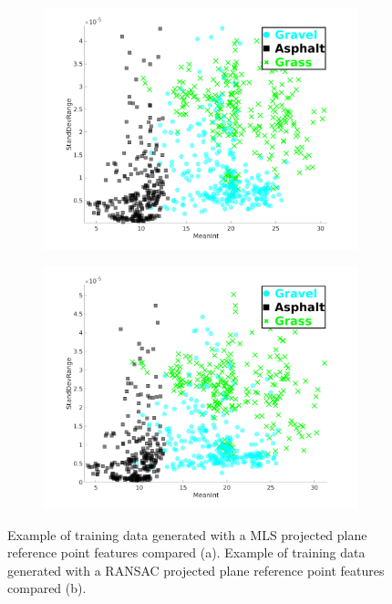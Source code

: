 \documentclass[numbered,pdftex]{ohio-etd}
\begin{document}
{{		\begin{figure}[H]
			\centering
			\begin{subfigure}{0.475\textwidth}
			\centering
			\includegraphics[width=1.0\linewidth]{Defense_Images/MLS_MeanInt_StandDevRange}
			\caption[]{}
			\label{fig:mls_training_data_cluster}
			\end{subfigure}
			\begin{subfigure}{0.475\textwidth}
			\centering
			\includegraphics[width=1.0\linewidth]{Defense_Images/Ransac_MeanInt_StandDevRange}
			\caption[]{}
			\label{fig:ransac_training_data_cluster}
			\end{subfigure}
			\caption[MLS \& RANSAC Data Clustering]{Example of training data generated with a MLS projected plane reference point features compared (a). Example of training data generated with a RANSAC projected plane reference point features compared (b).}
			\label{fig:ransac_mls_training_data_clusters}
		\end{figure}
	
}}
\end{document}
